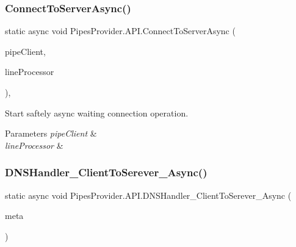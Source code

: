 \subsubsection{\texorpdfstring{Connect\+To\+Server\+Async()}{ConnectToServerAsync()}}
{\footnotesize\ttfamily static async void Pipes\+Provider.\+A\+P\+I.\+Connect\+To\+Server\+Async (\begin{DoxyParamCaption}\item[{Named\+Pipe\+Client\+Stream}]{pipe\+Client,  }\item[{\mbox{\hyperlink{class_pipes_provider_1_1_transmission_line}{Transmission\+Line}}}]{line\+Processor }\end{DoxyParamCaption})\hspace{0.3cm}{\ttfamily [static]}, {\ttfamily [private]}}



Start saftely async waiting connection operation. 


\begin{DoxyParams}{Parameters}
{\em pipe\+Client} & \\
\hline
{\em line\+Processor} & \\
\hline
\end{DoxyParams}
\mbox{\label{class_pipes_provider_1_1_a_p_i_ade8af5541a5787e55fe07bad71298132}} 
\subsubsection{\texorpdfstring{D\+N\+S\+Handler\+\_\+\+Client\+To\+Serever\+\_\+\+Async()}{DNSHandler\_ClientToSerever\_Async()}}
{\footnotesize\ttfamily static async void Pipes\+Provider.\+A\+P\+I.\+D\+N\+S\+Handler\+\_\+\+Client\+To\+Serever\+\_\+\+Async (\begin{DoxyParamCaption}\item[{\mbox{\hyperlink{class_pipes_provider_1_1_server_transmission_meta}{Pipes\+Provider.\+Server\+Transmission\+Meta}}}]{meta }\end{DoxyParamCaption})\hspace{0.3cm}{\ttfamily [static]}}



